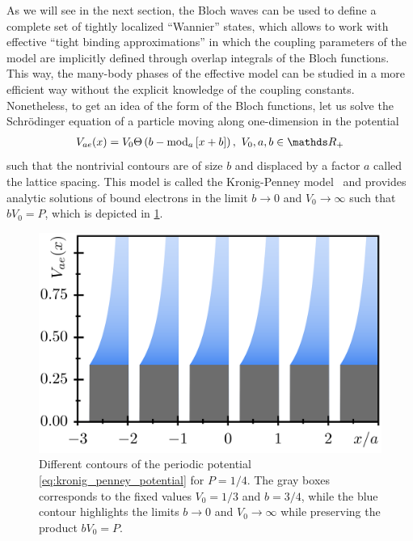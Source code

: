 As we will see in the next section, the Bloch waves can be used to define a complete set of tightly localized ``Wannier'' states, which allows to work with effective ``tight binding approximations'' in which the coupling parameters of the model are implicitly defined through overlap integrals of the Bloch functions.
This way, the many-body phases of the effective model can be studied in a more efficient way without the explicit knowledge of the coupling constants.
Nonetheless, to get an idea of the form of the Bloch functions, let us solve the Schrödinger equation of a particle moving along one-dimension in the potential
\begin{align}
    V_{ae}(x) = V_0 \Theta\brlr{b-{\rm mod}_{a}\commutator{x+b}},\ V_0,a,b\in\mathds R_+
    \label{eq:kronig_penney_potential}
\end{align}
such that the nontrivial contours are of size $b$ and displaced by a factor $a$ called the lattice spacing.
This model is called the Kronig-Penney model~\cite{KronigPenney1931} and provides analytic solutions of bound electrons in the limit $b\rightarrow0$ and $V_0\rightarrow\infty$ such that $bV_0=P$, which is depicted in \cref{fig:kronig_penney_potential}.
\begin{figure}
    \centering
    \includegraphics{figures/kronig_penney_potential.png}
    \caption{Different contours of the periodic potential \cref{eq:kronig_penney_potential} for $P=1/4$. The gray boxes corresponds to the fixed values $V_0=1/3$ and $b=3/4$, while the blue contour highlights the limits $b\rightarrow0$ and $V_0\rightarrow\infty$ while preserving the product $bV_0=P$.}
    \label{fig:kronig_penney_potential}
\end{figure}

